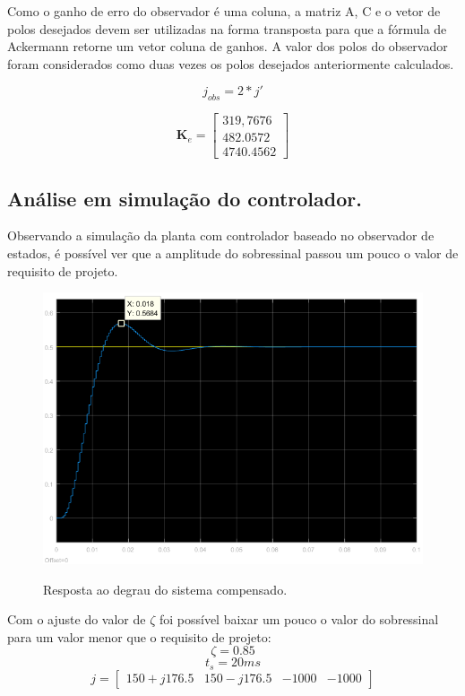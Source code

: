 \documentclass[
	article,			%
	11pt,				%
	oneside,			%
	a4paper,			%
	english,			%
	brazil,				%
	sumario=tradicional
	]{abntex2}
\begin{document}
Como o ganho de erro do observador é uma coluna, a matriz A, C e o vetor de polos desejados devem ser utilizadas na forma transposta para que a fórmula de Ackermann retorne um vetor coluna de ganhos. A valor dos polos do observador foram considerados como duas vezes os polos desejados anteriormente calculados.

$$
j_{obs}= 2*j'
$$

$$
\textbf{K}_e
=
\left[
\begin{array}{c}
 319,7676\\
 482.0572\\
 4740.4562
\end{array}
\right]
$$

\pagebreak

\subsection{Análise em simulação do controlador.}

Observando a simulação da planta com controlador baseado no observador de estados, é possível ver que a amplitude do sobressinal passou um pouco o valor de requisito de projeto.

\begin{figure}[htb!]
	\centering
	\caption{Resposta ao degrau do sistema compensado.}
	\includegraphics[scale=0.55]{./img/stepCtrlObs_1.png}
	\label{fig:stepCtrlObs_1}
\end{figure}

Com o ajuste do valor de $\zeta$ foi possível baixar um pouco o valor do sobressinal para um valor menor que o requisito de projeto:
$$
\zeta = 0.85
$$
$$
t_s = 20 ms
$$
$$
j=
\left[
\begin{array}{cccc}
150+j176.5 &  150-j176.5 & -1000 & -1000
\end{array}
\right]
$$
\end{document}
